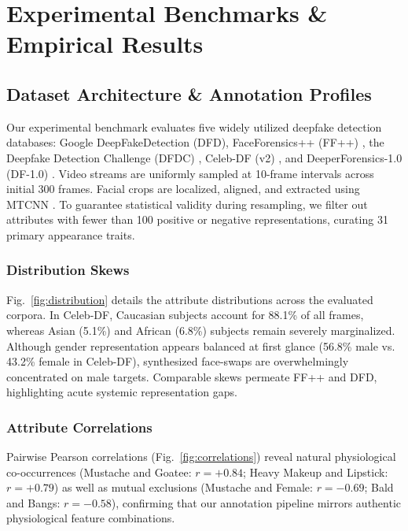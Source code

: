 \documentclass[journal]{IEEEtran}
\begin{document}
\section{Experimental Benchmarks \& Empirical Results}
\label{sec:experiments}

\subsection{Dataset Architecture \& Annotation Profiles}
\label{subsec:database_annotations}
Our experimental benchmark evaluates five widely utilized deepfake detection databases: Google DeepFakeDetection (DFD), FaceForensics++ (FF++) \cite{rossler2019faceforensics}, the Deepfake Detection Challenge (DFDC) \cite{dolhansky2020deepfake}, Celeb-DF (v2) \cite{li2020celebdf}, and DeeperForensics-1.0 (DF-1.0) \cite{jiang2020deeperforensics}. Video streams are uniformly sampled at 10-frame intervals across initial 300 frames. Facial crops are localized, aligned, and extracted using MTCNN \cite{zhang2016joint}. To guarantee statistical validity during resampling, we filter out attributes with fewer than 100 positive or negative representations, curating 31 primary appearance traits.

\subsubsection{Distribution Skews}
Fig.~\ref{fig:distribution} details the attribute distributions across the evaluated corpora. In Celeb-DF, Caucasian subjects account for 88.1\% of all frames, whereas Asian (5.1\%) and African (6.8\%) subjects remain severely marginalized. Although gender representation appears balanced at first glance (56.8\% male vs. 43.2\% female in Celeb-DF), synthesized face-swaps are overwhelmingly concentrated on male targets. Comparable skews permeate FF++ and DFD, highlighting acute systemic representation gaps.

\subsubsection{Attribute Correlations}
Pairwise Pearson correlations (Fig.~\ref{fig:correlations}) reveal natural physiological co-occurrences (Mustache and Goatee: $r = +0.84$; Heavy Makeup and Lipstick: $r = +0.79$) as well as mutual exclusions (Mustache and Female: $r = -0.69$; Bald and Bangs: $r = -0.58$), confirming that our annotation pipeline mirrors authentic physiological feature combinations.
\end{document}
